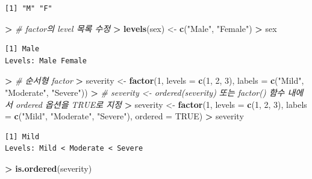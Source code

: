 \documentclass[11pt,a4paper]{book}
\newenvironment{Shaded}{\begin{snugshade}}{\end{snugshade}}
\newcommand{\KeywordTok}[1]{\textcolor[rgb]{0.13,0.29,0.53}{\textbf{#1}}}
\newcommand{\DataTypeTok}[1]{\textcolor[rgb]{0.13,0.29,0.53}{#1}}
\newcommand{\DecValTok}[1]{\textcolor[rgb]{0.00,0.00,0.81}{#1}}
\newcommand{\StringTok}[1]{\textcolor[rgb]{0.31,0.60,0.02}{#1}}
\newcommand{\CommentTok}[1]{\textcolor[rgb]{0.56,0.35,0.01}{\textit{#1}}}
\newcommand{\OtherTok}[1]{\textcolor[rgb]{0.56,0.35,0.01}{#1}}
\newcommand{\OperatorTok}[1]{\textcolor[rgb]{0.81,0.36,0.00}{\textbf{#1}}}
\newcommand{\ErrorTok}[1]{\textcolor[rgb]{0.64,0.00,0.00}{\textbf{#1}}}
\newcommand{\NormalTok}[1]{#1}
\theoremstyle{definition}
\theoremstyle{definition}
\theoremstyle{definition}
\theoremstyle{remark}
\begin{document}
\begin{verbatim}
[1] "M" "F"
\end{verbatim}

\begin{Shaded}
\begin{Highlighting}[]
\OperatorTok{>}\StringTok{ }\CommentTok{# factor의 level 목록 수정}
\ErrorTok{>}\StringTok{ }\KeywordTok{levels}\NormalTok{(sex) <-}\StringTok{ }\KeywordTok{c}\NormalTok{(}\StringTok{"Male"}\NormalTok{, }\StringTok{"Female"}\NormalTok{)}
\OperatorTok{>}\StringTok{ }\NormalTok{sex}
\end{Highlighting}
\end{Shaded}

\begin{verbatim}
[1] Male
Levels: Male Female
\end{verbatim}

\begin{Shaded}
\begin{Highlighting}[]
\OperatorTok{>}\StringTok{ }\CommentTok{# 순서형 factor}
\ErrorTok{>}\StringTok{ }\NormalTok{severity <-}\StringTok{ }\KeywordTok{factor}\NormalTok{(}\DecValTok{1}\NormalTok{, }\DataTypeTok{levels =} \KeywordTok{c}\NormalTok{(}\DecValTok{1}\NormalTok{, }\DecValTok{2}\NormalTok{, }\DecValTok{3}\NormalTok{), }\DataTypeTok{labels =} \KeywordTok{c}\NormalTok{(}\StringTok{"Mild"}\NormalTok{, }\StringTok{"Moderate"}\NormalTok{, }\StringTok{"Severe"}\NormalTok{))}
\OperatorTok{>}\StringTok{ }\CommentTok{# severity <- ordered(severity) 또는 factor() 함수 내에서 ordered 옵션을 TRUE로 지정}
\ErrorTok{>}\StringTok{ }\NormalTok{severity <-}\StringTok{ }\KeywordTok{factor}\NormalTok{(}\DecValTok{1}\NormalTok{, }\DataTypeTok{levels =} \KeywordTok{c}\NormalTok{(}\DecValTok{1}\NormalTok{, }\DecValTok{2}\NormalTok{, }\DecValTok{3}\NormalTok{), }\DataTypeTok{labels =} \KeywordTok{c}\NormalTok{(}\StringTok{"Mild"}\NormalTok{, }\StringTok{"Moderate"}\NormalTok{, }\StringTok{"Severe"}\NormalTok{), }\DataTypeTok{ordered =} \OtherTok{TRUE}\NormalTok{)}
\OperatorTok{>}\StringTok{ }\NormalTok{severity}
\end{Highlighting}
\end{Shaded}

\begin{verbatim}
[1] Mild
Levels: Mild < Moderate < Severe
\end{verbatim}

\begin{Shaded}
\begin{Highlighting}[]
\OperatorTok{>}\StringTok{ }\KeywordTok{is.ordered}\NormalTok{(severity)}
\end{Highlighting}
\end{Shaded}
\end{document}
